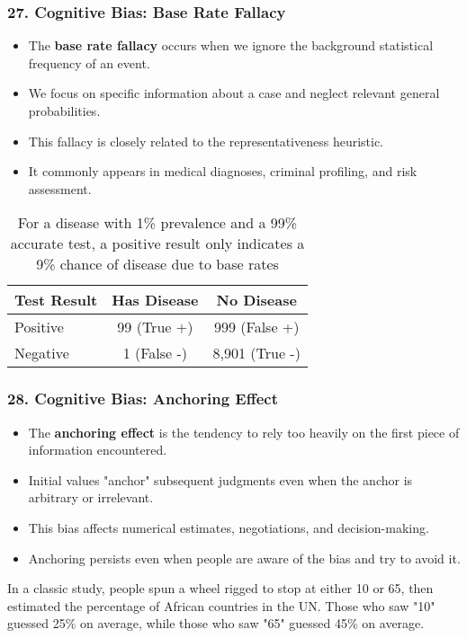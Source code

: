 \documentclass{beamer}
\begin{document}
\begin{frame}
\frametitle{27. Cognitive Bias: Base Rate Fallacy}
\begin{itemize}
\item The \textbf{base rate fallacy} occurs when we ignore the background statistical frequency of an event.
\item We focus on specific information about a case and neglect relevant general probabilities.
\item This fallacy is closely related to the representativeness heuristic.
\item It commonly appears in medical diagnoses, criminal profiling, and risk assessment.
\end{itemize}

\begin{table}
\centering
\begin{tabular}{|l|c|c|}
\hline
\textbf{Test Result} & \textbf{Has Disease} & \textbf{No Disease} \\
\hline
Positive & 99 (True +) & 999 (False +) \\
\hline
Negative & 1 (False -) & 8,901 (True -) \\
\hline
\end{tabular}
\caption{For a disease with 1\% prevalence and a 99\% accurate test, a positive result only indicates a 9\% chance of disease due to base rates}
\end{table}
\end{frame}

\begin{frame}
\frametitle{28. Cognitive Bias: Anchoring Effect}
\begin{itemize}
\item The \textbf{anchoring effect} is the tendency to rely too heavily on the first piece of information encountered.
\item Initial values "anchor" subsequent judgments even when the anchor is arbitrary or irrelevant.
\item This bias affects numerical estimates, negotiations, and decision-making.
\item Anchoring persists even when people are aware of the bias and try to avoid it.
\end{itemize}

\begin{example}
In a classic study, people spun a wheel rigged to stop at either 10 or 65, then estimated the percentage of African countries in the UN. Those who saw "10" guessed 25\% on average, while those who saw "65" guessed 45\% on average.
\end{example}
\end{frame}
\end{document}
